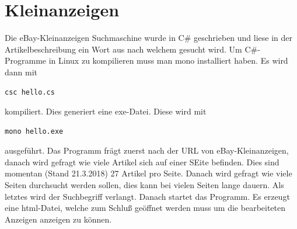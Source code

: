 \documentclass[11pt,fleqn]{book} %
\numberwithin{equation}{section} %
\numberwithin{figure}{section} %
\numberwithin{table}{section} %
\begin{document}
\section{Kleinanzeigen}
Die eBay-Kleinanzeigen Suchmaschine wurde in C\# geschrieben und liese in der Artikelbeschreibung ein Wort aus nach welchem gesucht wird. Um C\#-Programme in Linux zu kompilieren muss man mono installiert haben. Es wird dann mit
\begin{lstlisting}
csc hello.cs
\end{lstlisting}
kompiliert. Dies generiert eine exe-Datei. Diese wird mit
\begin{lstlisting}
mono hello.exe
\end{lstlisting}
ausgeführt. Das Programm frägt zuerst nach der URL von eBay-Kleinanzeigen, danach wird gefragt wie viele Artikel sich auf einer SEite befinden. Dies sind momentan (Stand 21.3.2018) 27 Artikel pro Seite. Danach wird gefragt wie viele Seiten durchsucht werden sollen, dies kann bei vielen Seiten lange dauern. Als letztes wird der Suchbegriff verlangt. Danach startet das Programm. Es erzeugt eine html-Datei, welche zum Schluß geöffnet werden muss um die bearbeiteten Anzeigen anzeigen zu können.
\end{document}
